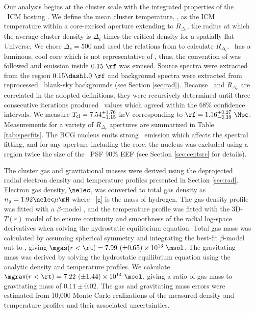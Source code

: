 \documentclass[useAMS,usenatbib]{mn2e}
\begin{document}
Our analysis begins at the cluster scale with the integrated
properties of the \rxj\ ICM hosting \irs. We define the mean cluster
temperature, \cltx, as the ICM temperature within a core-excised
aperture extending to $R_{\Delta_c}$, the radius at which the average
cluster density is $\Delta_c$ times the critical density for a
spatially flat Universe. We chose $\Delta_c = 500$ and used the
relations from \cite{2002A&A...389....1A} to calculate
$R_{\Delta_c}$. \irs\ has a luminous, cool core which is not
representative of \cltx, thus, the convention of
\citet{2007ApJ...668..772M} was followed and emission inside $0.15
~\rf$ was excised. Source spectra were extracted from the region $0.15
\dash 1.0~\rf$ and background spectra were extracted from reprocessed
\caldb\ blank-sky backgrounds (see Section \ref{sec:rad}). Because
\cltx\ and $R_{\Delta_c}$ are correlated in the adopted definitions,
they were recursively determined until three consecutive iterations
produced \cltx\ values which agreed within the 68\% confidence
intervals. We measure $T_{\mathrm{cl}} = 7.54^{+1.76}_{-1.15}$ keV corresponding
to $\rf = 1.16^{+0.27}_{-0.19}~\Mpc$. Measurements for a variety of
$R_{\Delta_c}$ apertures are summarized in Table \ref{tab:specfits}.
The BCG nucleus emits strong \feka\ emission which affects the
spectral fitting, and for any aperture including the core, the nucleus
was excluded using a region twice the size of the \chandra\ PSF 90\%
EEF (see Section \ref{sec:centsrc} for details).

The cluster gas and gravitational masses were derived using the
deprojected radial electron density and temperature profiles presented
in Section \ref{sec:rad}. Electron gas density, $\nelec$, was
converted to total gas density as $n_g = 1.92 \nelec \mu \mH$ where
\mH\ [g] is the mass of hydrogen. The gas density profile was fitted
with a $\beta$-model \citep{betamodel}, and the temperature profile
was fitted with the 3D-$T(r)$ model of \citet{2006ApJ...640..691V} to
ensure continuity and smoothness of the radial log-space derivatives
when solving the hydrostatic equilibrium equation. Total gas mass was
calculated by assuming spherical symmetry and integrating the best-fit
$\beta$-model out to \rt, giving $\mgas(r<\rt) = 7.99 ~(\pm 0.65)
\times 10^{13} ~\msol$. The gravitating mass was derived by solving
the hydrostatic equilibrium equation using the analytic density and
temperature profiles. We calculate $\mgrav(r<\rt) = 7.22 ~(\pm 1.44)
\times 10^{14} ~\msol$, giving a ratio of gas mass to gravitating mass
of $0.11 \pm 0.02$. The gas and gravitating mass errors were estimated
from 10,000 Monte Carlo realizations of the measured density and
temperature profiles and their associated uncertainties.
\end{document}

